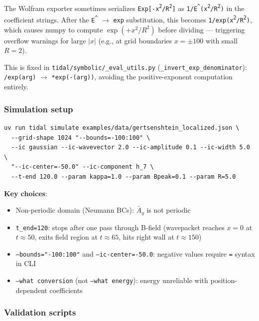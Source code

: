 The Wolfram exporter sometimes serializes \texttt{Exp[-x\textsuperscript{2}/R\textsuperscript{2}]} as \texttt{1/E\textsuperscript{\^{}}(x\textsuperscript{2}/R\textsuperscript{2})} in the
coefficient strings. After the \texttt{E\textsuperscript{\^{}}} $\to$ \texttt{exp} substitution, this becomes \texttt{1/exp(x\textsuperscript{2}/R\textsuperscript{2})},
which causes numpy to compute $\exp(+x^2/R^2)$ before dividing --- triggering overflow warnings
for large $|x|$ (e.g., at grid boundaries $x = \pm 100$ with small $R = 2$).

This is fixed in \texttt{tidal/symbolic/\_eval\_utils.py} (\texttt{\_invert\_exp\_denominator}): \texttt{/exp(arg)} $\to$
\texttt{*exp(-(arg))}, avoiding the positive-exponent computation entirely.

\subsubsection{Simulation setup}
\label{sec:sim-setup}

\begin{lstlisting}[style=bash]
uv run tidal simulate examples/data/gertsenshtein_localized.json \
  --grid-shape 1024 "--bounds=-100:100" \
  --ic gaussian --ic-wavevector 2.0 --ic-amplitude 0.1 --ic-width 5.0 \
  "--ic-center=-50.0" --ic-component h_7 \
  --t-end 120.0 --param kappa=1.0 --param Bpeak=0.1 --param R=5.0
\end{lstlisting}

\textbf{Key choices}:
\begin{itemize}
  \item Non-periodic domain (Neumann BCs): $\bar{A}_y$ is not periodic
  \item \texttt{t\_end=120}: stops after one pass through B-field (wavepacket reaches $x=0$ at $t \approx 50$,
    exits field region at $t \approx 65$, hits right wall at $t \approx 150$)
  \item \texttt{--bounds="-100:100"} and \texttt{--ic-center=-50.0}: negative values require \texttt{=} syntax in CLI
  \item \texttt{--what conversion} (not \texttt{--what energy}): energy unreliable with position-dependent coefficients
\end{itemize}

\subsubsection{Validation scripts}
\label{sec:validation-scripts}

